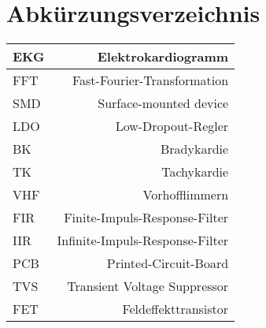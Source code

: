 
\section{Abkürzungsverzeichnis} 

\begin{tabular}[]{l|r}
EKG & Elektrokardiogramm 
\\
\hline
FFT & Fast-Fourier-Transformation 
\\
\hline
SMD & Surface-mounted device 
\\
\hline
LDO & Low-Dropout-Regler 
\\
\hline
BK & Bradykardie 
\\
\hline
TK & Tachykardie
\\
\hline
VHF & Vorhofflimmern
\\
\hline
FIR & Finite-Impuls-Response-Filter
\\
\hline
IIR & Infinite-Impuls-Response-Filter
\\
\hline
PCB & Printed-Circuit-Board
\\
\hline
TVS & Transient Voltage Suppressor
\\
\hline
FET & Feldeffekttransistor

\end{tabular}
